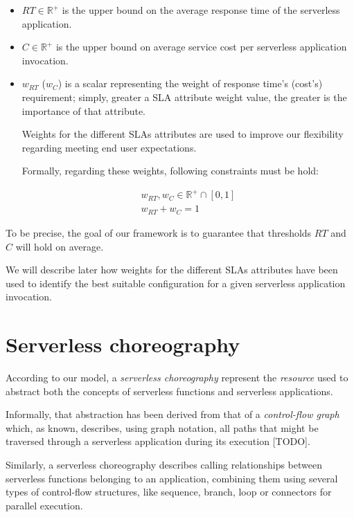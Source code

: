 \documentclass[12pt,a4paper]{report}
\begin{document}
\begin{itemize}
	\item $RT \in \mathbb{R}^+$ is the upper bound on the average
	response time of the serverless application.
	
	\item $C \in \mathbb{R}^+$ is the upper bound on average service cost per serverless application invocation.
	
	\item $w_{RT}$ ($w_{C}$) is a scalar representing the weight of response time's (cost's) requirement; simply, greater a SLA attribute weight value, the greater is the importance of that attribute. 
	
	Weights for the different SLAs attributes are used to improve our flexibility regarding meeting end user expectations. 
	
	Formally, regarding these weights, following constraints must be hold:
	
	\begin{eqnarray}
		w_{RT},w_{C} \in \mathbb{R}^+ \cap \left[ 0,1 \right] \\
		w_{RT} + w_{C} = 1
	\end{eqnarray}
\end{itemize}

To be precise, the goal of our framework is to guarantee that thresholds $RT$ and $C$ will hold on average.

We will describe later how weights for the different SLAs attributes have been used to identify the best suitable configuration for a given serverless application invocation.

\section{Serverless choreography}

According to our model, a \textit{serverless choreography} represent the \textit{resource} used to abstract both the concepts of serverless functions and serverless applications.

Informally, that abstraction has been derived from that of a \textit{control-flow graph} which, as known, describes, using graph notation, all paths that might be traversed through a serverless application during its execution [TODO]. 

Similarly, a serverless choreography describes calling relationships between serverless functions belonging to an application, combining them using several types of control-flow structures, like sequence, branch, loop or connectors for parallel execution. 
\end{document}
